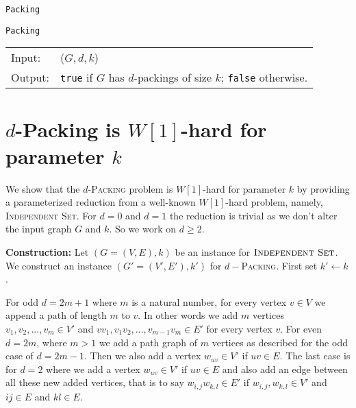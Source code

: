 \documentclass[10pt, a4paper]{article}
\theoremstyle{definition}
\newcommand{\n}{\\}
\begin{document}
\begin{algorithm}[H]
\caption{\texttt{Packing}}          %
\label{algo:packing} 
\texttt{Packing}\n
\begin{tabular}{l l}
 Input:  & ($G, d, k$) \n
 Output: & \texttt{true} if $G$ has $d$-packings of size $k$; \texttt{false} otherwise. \n
\end{tabular}	

\end{algorithm}

\clearpage
\section{$d$-\sc Packing \textnormal{is $W[1]$-hard for parameter $k$}}


We show that the $d$-\textsc{Packing} problem is $W[1]$-hard for parameter $k$ by providing a parameterized reduction from a well-known $W[1]$-hard problem, namely, \textsc{Independent Set}.	For $d = 0$ and $d = 1$ the reduction is trivial as we don't alter the input graph $G$ and $k$. So we work on $d \geq 2$.

\textbf{Construction:} Let $(G = (V,E) ,k)$ be an instance for $\textsc{Independent Set}$. We construct an instance $(G' = (V',E'),k')$ for $d-$\textsc{Packing}. First set $k' \leftarrow k$. 

For odd $d = 2m+1$ where $m$ is a natural number, for every vertex $v \in V$ we append a path of length $m$ to $v$. In other words we add $m$ vertices $v_1, v_2, ..., v_m \in V'$ and $vv_1, v_1v_2,...,v_{m-1}v_m \in E'$ for every vertex $v$.
For even $d = 2m$, where $m > 1$ we add a path graph of $m$ vertices as described for the odd case of $d = 2m - 1$. Then we also add a vertex $w_{uv} \in V'$ if $uv \in E$.
The last case is for $d = 2$ where we add a vertex $w_{uv} \in V'$ if $uv \in E$ and also add an edge between all these new added vertices, that is to say $w_{i,j}w_{k,l} \in E'$ if $w_{i,j},w_{k,l} \in V'$ and $ij \in E$ and $kl \in E$.

\end{document}
